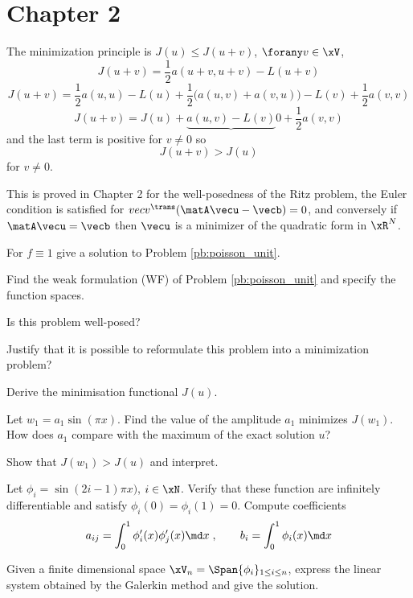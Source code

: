 
\section{Chapter 2}

\begin{tmasltn}{2.1}
\begin{tmatsks}
\item The minimization principle is $J(u) \leq J(u+v)$, $\forany v \in \xV$,
\begin{equation*}
J(u+v) = \frac{1}{2} a(u + v,u + v) - L(u + v)
\end{equation*}
\begin{equation*}
J(u+v) = \frac{1}{2} a(u,u) - L(u) + \frac{1}{2} \bigr(a(u, v)+a(v, u)\bigr) - L(v) + \frac{1}{2} a(v,v)
\end{equation*}
\begin{equation*}
J(u+v) = J(u) + \underbrace{a(u,v) - L(v)}{0} + \frac{1}{2} a(v,v)
\end{equation*}
and the last term is positive for $v\neq 0$ so
\begin{equation*}
J(u+v) > J(u)
\end{equation*}
for $v\neq0$.
\item This is proved in Chapter 2 for the well-posedness of the Ritz problem, the Euler condition is satisfied for $vecv^\trans (\matA\vecu - \vecb) = 0$, and conversely if $\matA\vecu = \vecb$ then $\vecu$ is a minimizer of the quadratic form in $\xR^N$.
\end{tmatsks}
\end{tmasltn}

\begin{tmasltn}{2.2}
\begin{tmatsks}
\item For $f \equiv 1$ give a solution to Problem \eqref{pb:poisson_unit}.
\item Find the weak formulation (WF) of Problem \eqref{pb:poisson_unit} and specify the function spaces.
\item Is this problem well-posed?
\item Justify that it is possible to reformulate this problem into a minimization problem?
\item Derive the minimisation functional $J(u)$.
\item Let $w_1 = a_1 \sin(\pi x)$. Find the value of the amplitude $a_1$ minimizes $J(w_1)$. How does $a_1$ compare with the maximum of the exact solution $u$?
\item Show that $J(w_1) > J(u)$ and interpret.
\item Let $\phi_i = \sin(2 i - 1) \pi x)$, $i\in\xN$. Verify that these function are infinitely differentiable and satisfy $\phi_i(0)= \phi_i(1)=0$. Compute coefficients
\begin{equation*}
a_{ij} = \int_0^1 \phi_i'(x) \phi_j'(x) \md x\;, \qquad b_i = \int_0^1 \phi_i(x) \md x
\end{equation*}
\item Given a finite dimensional space $\xV_n = \Span \lbrace \phi_i \rbrace_{1\leq i \leq n}$, express the linear system obtained by the Galerkin method and give the solution.
\end{tmatsks}
\end{tmasltn}

